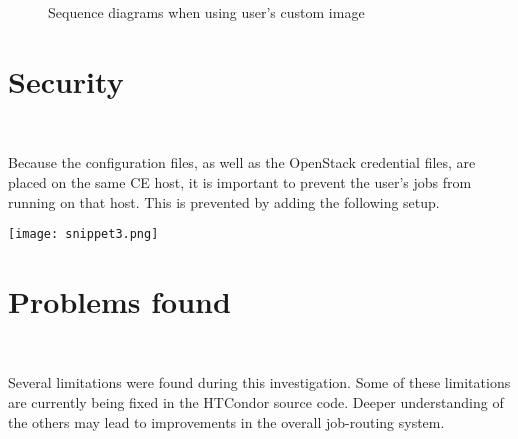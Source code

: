 \documentclass[a4paper]{jpconf}
\begin{document}
\begin{figure}[h]
    \centering
    \qquad
    \caption{Sequence diagrams when using user's custom image}%
    \label{fig:custom}%
\end{figure}


\section{Security}

~

Because the configuration files, as well as the OpenStack credential files, 
are placed on the same CE host, it is important to prevent the user's jobs from running on that host.
This is prevented by adding the following setup.


\begin{snippet}[h]
    \centering
    \renewcommand\figurename{Snippet}
    \texttt{[image: snippet3.png]}
    \caption{Setup to prevent user's jobs being forked at the HTCondor-CE host}
    \label{snip:snippet3}
\end{snippet}



\section{Problems found}

~

Several limitations were found during this investigation.
Some of these limitations are currently being fixed in the HTCondor source code.
Deeper understanding of the others may lead to improvements in the overall
job-routing system.
\end{document}
